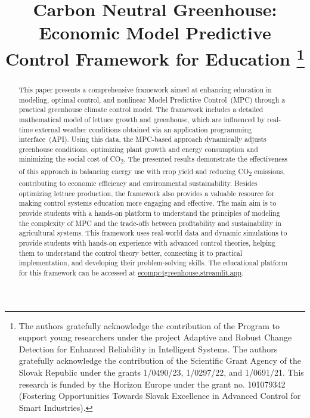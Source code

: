 \documentclass[conference]{IEEEtran}
\begin{document}
\title{Carbon Neutral Greenhouse: Economic Model Predictive Control Framework for Education
    \thanks{The authors gratefully acknowledge the contribution of the Program to support young researchers under the project Adaptive and Robust Change Detection for Enhanced Reliability in Intelligent Systems. The authors gratefully acknowledge the contribution of the Scientific Grant Agency of the Slovak Republic under the grants 1/0490/23, 1/0297/22, and 1/0691/21. This research is funded by the Horizon Europe under the grant no. 101079342 (Fostering Opportunities Towards Slovak Excellence in Advanced Control for Smart Industries).}
}

\author{
}

\maketitle

\begin{abstract}
    This paper presents a comprehensive framework aimed at enhancing education in modeling, optimal control, and nonlinear Model Predictive Control~(MPC) through a practical greenhouse climate control model. The framework includes a detailed mathematical model of lettuce growth and greenhouse, which are influenced by real-time external weather conditions obtained via an application programming interface~(API). Using this data, the MPC-based approach dynamically adjusts greenhouse conditions, optimizing plant growth and energy consumption and minimizing the social cost of CO\textsubscript{2}. The presented results demonstrate the effectiveness of this approach in balancing energy use with crop yield and reducing CO\textsubscript{2} emissions, contributing to economic efficiency and environmental sustainability.
    Besides optimizing lettuce production, the framework also provides a valuable resource for making control systems education more engaging and effective. The main aim is to provide students with a hands-on platform to understand the principles of modeling the complexity of MPC and the trade-offs between profitability and sustainability in agricultural systems. This framework uses real-world data and dynamic simulations to provide students with hands-on experience with advanced control theories, helping them to understand the control theory better, connecting it to practical implementation, and developing their problem-solving skills. The educational platform for this framework can be accessed at \url{ecompc4greenhouse.streamlit.app}.
\end{abstract}
\end{document}
